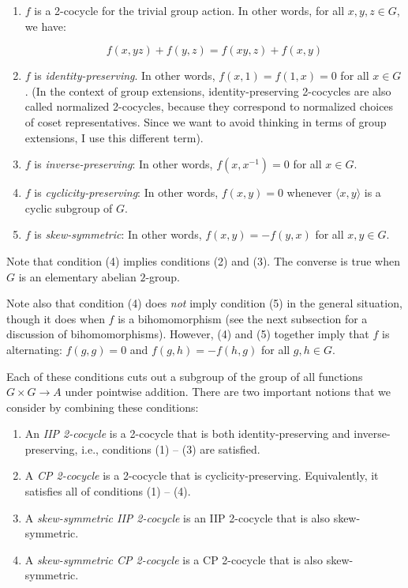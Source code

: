 \documentclass[10pt]{amsart}
\begin{document}
\begin{enumerate}
\item $f$ is a 2-cocycle for the trivial group action. In other words,
  for all $x,y,z \in G$, we have:

  $$f(x,yz) + f(y,z) = f(xy,z) + f(x,y)$$

\item $f$ is {\em identity-preserving}. In other words, $f(x,1) =
  f(1,x) = 0$ for all $x \in G$. (In the context of group extensions,
  identity-preserving 2-cocycles are also called normalized
  2-cocycles, because they correspond to normalized choices of coset
  representatives. Since we want to avoid thinking in terms of group
  extensions, I use this different term).
\item $f$ is {\em inverse-preserving}: In other words, $f(x,x^{-1}) =
  0$ for all $x \in G$.
\item $f$ is {\em cyclicity-preserving}: In other words, $f(x,y) = 0$
  whenever $\langle x,y \rangle$ is a cyclic subgroup of $G$.
\item $f$ is {\em skew-symmetric}: In other words, $f(x,y) = -f(y,x)$
  for all $x,y \in G$.
\end{enumerate}

Note that condition (4) implies conditions (2) and (3). The converse
is true when $G$ is an elementary abelian $2$-group.

Note also that condition (4) does {\em not} imply condition (5) in the
general situation, though it does when $f$ is a bihomomorphism (see
the next subsection for a discussion of bihomomorphisms). However, (4)
and (5) together imply that $f$ is alternating: $f(g,g) = 0$ and
$f(g,h) = -f(h,g)$ for all $g,h \in G$.

Each of these conditions cuts out a subgroup of the group of all
functions $G \times G \to A$ under pointwise addition. There are two
important notions that we consider by combining these conditions:

\begin{enumerate}
\item An {\em IIP 2-cocycle} is a 2-cocycle that is both
  identity-preserving and inverse-preserving, i.e., conditions (1) --
  (3) are satisfied.
\item A {\em CP 2-cocycle} is a 2-cocycle that is
  cyclicity-preserving. Equivalently, it satisfies all of conditions
  (1) -- (4).
\item A {\em skew-symmetric IIP 2-cocycle} is an IIP 2-cocycle that is
  also skew-symmetric.
\item A {\em skew-symmetric CP 2-cocycle} is a CP 2-cocycle that is
  also skew-symmetric.
\end{enumerate}
\end{document}
